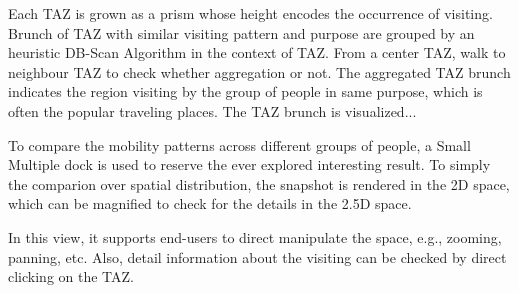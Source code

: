 Each TAZ is grown as a prism whose height encodes the occurrence of visiting. Brunch of TAZ with similar visiting pattern and purpose are grouped by an heuristic DB-Scan Algorithm in the context of TAZ. From a center TAZ, walk to neighbour TAZ to check whether aggregation or not. The aggregated TAZ brunch indicates the region visiting by the group of people in same purpose, which is often the popular traveling places. The TAZ brunch is visualized...

 To compare the mobility patterns across different groups of people, a Small Multiple dock is used to reserve the ever explored interesting result. To simply the comparion over spatial distribution, the snapshot is rendered in the 2D space, which can be magnified to check for the details in the 2.5D space.

 In this view, it supports end-users to direct manipulate the space, e.g., zooming, panning, etc. Also, detail information about the visiting can be checked by direct clicking on the TAZ. 